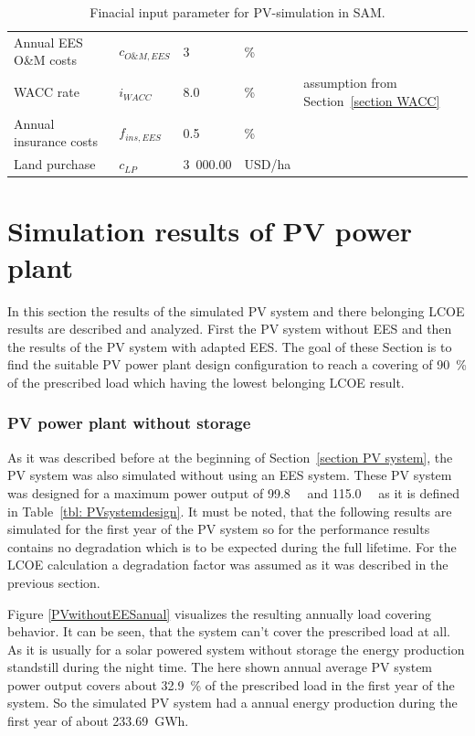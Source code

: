 \begin{table}[!h]
\begin{tabular}{  p{5.4cm} C{1.5cm} C{1.5cm}  C{1.7cm}  C{4.0cm} }
Annual EES O\&M costs & $c_{O\&M,EES}$ & 3 & \% & \cite{IEA2014c}\\
WACC rate & $i_{WACC}$ & 8.0 & \si{\percent} & assumption from Section~\ref{section WACC} \\ 
Annual insurance costs& $f_{ins,EES}$ & 0.5 & \% & \cite{Cutter2014}\\ \hline
Land purchase &$c_{LP}$ & 3~000.00 & USD/ha & \cite{Cassell2012} \\ 
\hline
\end{tabular}
\caption[Finacial input parameter for PV-simulation in SAM.]{Finacial input parameter for PV-simulation in SAM.}\label{tbl: PVFinance}
\end{table}
\pagebreak
\section{Simulation results of PV power plant}
In this section the results of the simulated PV system and there belonging LCOE results are described and analyzed. First the PV system without EES and then the results of the PV system with adapted EES. The goal of these Section is to find the suitable PV power plant design configuration to reach a covering of \SI{90}{\percent} of the prescribed load which having the lowest belonging LCOE result.
\subsubsection{PV power plant without storage}
As it was described before at the beginning of Section~\ref{section PV system}, the PV system was also simulated without using an EES system. These PV system was designed for a maximum power output of \SI{99.8}{\mega\wattsac} and \SI{115.0}{\mega\wattsdc} as it is defined in Table~\ref{tbl: PVsystemdesign}. It must be noted, that the following results are simulated for the first year of the PV system so for the performance results contains no degradation which is to be expected during the full lifetime. For the LCOE calculation a degradation factor was assumed as it was described in the previous section. 

Figure \ref{PVwithoutEESanual} visualizes the resulting annually load covering behavior. It can be seen, that the system can't cover the prescribed load at all. As it is usually for a solar powered system without storage the energy production standstill during the night time. The here shown annual average PV system power output covers about \SI{32.9}{\percent} of the prescribed load in the first year of the system. So the simulated PV system had a annual energy production during the first year of about \SI{233.69}{GWh}.

